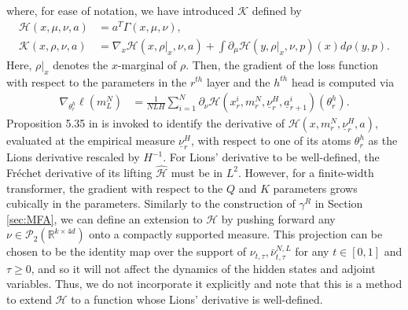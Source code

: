 \documentclass{article}
\newcommand{\R}{\mathbb{R}}
\begin{document}
 where, for ease of notation, we have introduced $\mathcal K$ defined by
\begin{align}\label{eqn:Hamil}
    \mathcal H(x,\mu,\nu,a) &= a^T\Gamma(x,\mu,\nu),\\
  \mathcal K(x,\rho,\nu,a)&= \nabla_x \mathcal H(x,\rho|_x,\nu,a)+ \int \partial_\mu \mathcal H(y,\rho|_x,\nu,p)(x)d\rho(y,p).    \label{eqn:mathcal_K}
\end{align}
Here, $\rho|_x$ denotes the $x$-marginal of $\rho$. Then, the gradient of the loss function with respect to the parameters in the $r^{th}$ layer and the $h^{th}$ head is computed via
\begin{align}
 \nabla_{\theta^h_r}\ell(m^N_L)&=\frac{1}{NLH}\sum_{i=1}^N \partial_\nu\mathcal H (x^i_{r}, m^N_{r},\underline{\nu}^H_r,\underline{a}^i_{r+1})(\theta^h_r).\label{eqn:grad}
\end{align}
 Proposition 5.35 in \cite{carmona2018probabilistic} is invoked to identify the derivative of $\mathcal H(x,m_r^N,\underline{\nu}_r^H,a)$, evaluated at the empirical measure $\underline{\nu}_r^H$, with respect to one of its atoms $\theta^h_r$ as the Lions derivative rescaled by $H^{-1}$. For Lions' derivative to be well-defined, the Fr\'echet derivative of its lifting $\hat {\mathcal H}$ must be in $L^2$. However, for a finite-width transformer, the gradient with respect to the $Q$ and $K$ parameters grows cubically in the parameters. Similarly to the construction of $\gamma^R$ in Section \ref{sec:MFA}, we can define an extension to $\mathcal H$  by pushing forward any $\nu \in \mathcal P_2(\R^{k\times 4d})$ onto a compactly supported measure. This projection can be chosen to be the identity map over the support of $\nu_{t,\tau},\bar \nu^{N,L}_{t,\tau}$ for any $t\in[0,1]$ and $\tau\ge 0$, and so it will not affect the dynamics of the hidden states and adjoint variables. Thus, we do not incorporate it explicitly and note that this is a method to extend $\mathcal H$ to a function whose Lions' derivative is well-defined. 
\end{document}
